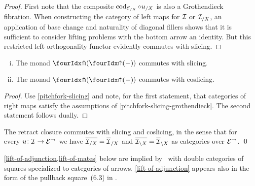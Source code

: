 \documentclass[reqno,10pt,a4paper,oneside,draft]{amsart}
\begin{document}
{{\begin{proof}
First note that the composite $\cod_{\cal{E}_{/X}} \cc u_{/X}$ is also a Grothendieck fibration.
When constructing the category of left maps for $\cal{I}$ or $\cal{I}_{/X}$, an application of base change and naturality of diagonal fillers shows that it is sufficient to consider lifting problems with the bottom arrow an identity.
But this restricted left orthogonality functor evidently commutes with slicing.
\end{proof}

\begin{corollary} \label{pitchfork-slicing-monad} \leavevmode
\begin{enumerate}[(i)]
\item The monad $\liftl{(\liftr{(-)})}$ commutes with slicing.
\item The monad $\liftr{(\liftl{(-)})}$ commutes with coslicing.
\end{enumerate}
\end{corollary}

\begin{proof}
Use \cref{pitchfork-slicing} and note, for the first statement, that categories of right maps satisfy the assumptions of \cref{pitchfork-slicing-grothendieck}.
The second statement follows dually.
\end{proof}

\begin{proposition}
The retract closure commutes with slicing and coslicing, in the sense that for every $u \co \cal{I} \to \catE^\to$ we have $\overline{\cal{I}_{/X}} = \overline{\cal{I}}_{/X}$ and $\overline{\cal{I}_{\backslash X}} = \overline{\cal{I}}_{\backslash X}$ as categories over $\catE^\to$.
\qed
\end{proposition}


\cref{lift-of-adjunction,lift-of-mates} below are implied by~\cite[Proposition~21]{bourke-garner-I} with double categories of squares specialized to categories of arrows.
\cref{lift-of-adjunction} appears also in the form of the pullback square~(6.3) in \cite{riehl-monoidal-ams}.

}}
\end{document}
